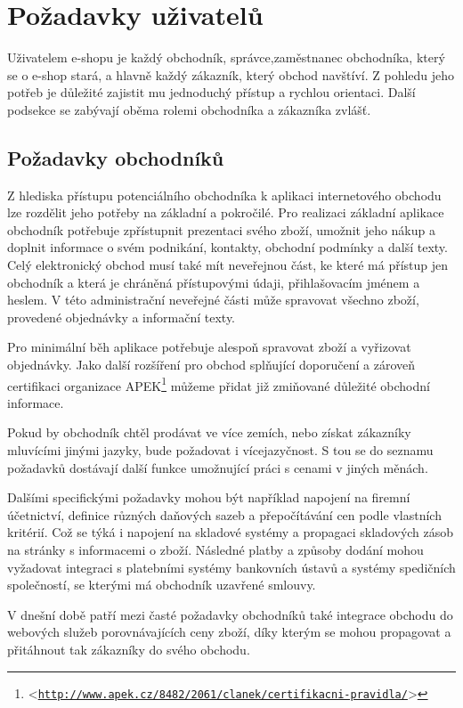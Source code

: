 \documentclass[11pt,twoside,a4paper]{book}
\let\oldUrl\url
\renewcommand\url[1]{<\texttt{\oldUrl{#1}}>}
\begin{document}
\section{Požadavky uživatelů}
\label{potreby3}
Uživatelem e-shopu je každý obchodník, správce,zaměstnanec obchodníka, který se o e-shop stará, a hlavně každý zákazník, který obchod navštíví. Z pohledu jeho potřeb je důležité zajistit mu jednoduchý přístup a rychlou orientaci. Další podsekce se zabývají oběma rolemi obchodníka a zákazníka zvlášť. 

\subsection{Požadavky obchodníků}
\label{potreby1}
Z hlediska přístupu potenciálního obchodníka k aplikaci internetového obchodu lze rozdělit jeho potřeby na základní a pokročilé. Pro realizaci základní aplikace obchodník potřebuje zpřístupnit prezentaci svého zboží, umožnit jeho nákup a doplnit informace o svém podnikání, kontakty, obchodní podmínky a další texty. Celý elektronický obchod musí také mít neveřejnou část, ke které má přístup jen obchodník a která je chráněná přístupovými údaji, přihlašovacím jménem a heslem. V této administrační neveřejné části může spravovat všechno zboží, provedené objednávky a informační texty.

Pro minimální běh aplikace potřebuje alespoň spravovat zboží a vyřizovat objednávky. Jako další rozšíření pro obchod splňující doporučení a zároveň certifikaci organizace APEK\footnote{\url{http://www.apek.cz/8482/2061/clanek/certifikacni-pravidla/}} můžeme přidat již zmiňované důležité obchodní informace.

Pokud by obchodník chtěl prodávat ve více zemích, nebo získat zákazníky mluvícími jinými jazyky, bude požadovat i vícejazyčnost. S tou se do seznamu požadavků dostávají další funkce umožnující práci s cenami v jiných měnách. 

Dalšími specifickými požadavky mohou být například napojení na firemní účetnictví, definice různých daňových sazeb a přepočítávání cen podle vlastních kritérií. Což se týká i napojení na skladové systémy a propagaci skladových zásob na stránky s informacemi o zboží. Následné platby a způsoby dodání mohou vyžadovat integraci s platebními systémy bankovních ústavů a systémy spedičních společností, se kterými má obchodník uzavřené smlouvy.

V dnešní době patří mezi časté požadavky obchodníků také integrace obchodu do webových služeb porovnávajících ceny zboží, díky kterým se mohou propagovat a přitáhnout tak zákazníky do svého obchodu.
\end{document}
